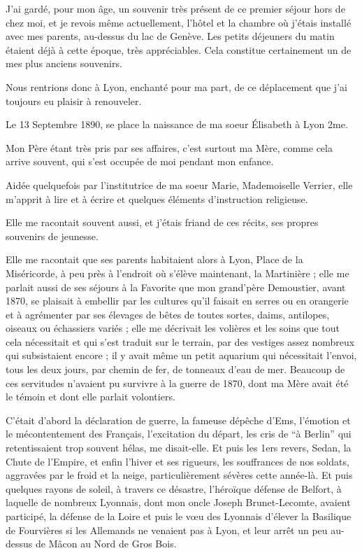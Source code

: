 \documentclass[11pt,a4paper]{report}
\begin{document}
J'ai gardé, pour mon âge, un souvenir très présent de ce premier séjour hors de chez moi, et je revois même actuellement, l'hôtel et la chambre où j'étais installé avec mes parents, au-dessus du lac de Genève. Les petits déjeuners du matin étaient déjà à cette époque, très appréciables. Cela constitue certainement un de mes plus anciens souvenirs.

Nous rentrions donc à Lyon, enchanté pour ma part, de ce déplacement que j'ai toujours eu plaisir à renouveler.

Le 13 Septembre 1890, se place la naissance de ma soeur Élisabeth à Lyon 2me.

Mon Père étant très pris par ses affaires, c'est surtout ma Mère, comme cela arrive souvent, qui s'est occupée de moi pendant mon enfance.

Aidée quelquefois par l'institutrice de ma soeur Marie, Mademoiselle Verrier, elle m'apprit à lire et à écrire et quelques éléments d'instruction religieuse.

Elle me racontait souvent aussi, et j'étais friand de ces récits, ses propres souvenirs de jeunesse.

Elle me racontait que ses parents habitaient alors à Lyon, Place de la Miséricorde, à peu près à l'endroit où s'élève maintenant, la Martinière ; elle me parlait aussi de ses séjours à la Favorite que mon grand'père Demoustier, avant 1870, se plaisait à embellir par les cultures qu'il faisait en serres ou en orangerie et à agrémenter par ses élevages de bêtes de toutes sortes, daims, antilopes, oiseaux ou échassiers variés ; elle me décrivait les volières et les soins que tout cela nécessitait et qui s'est traduit sur le terrain, par des vestiges assez nombreux qui subsistaient encore ; il y avait même un petit aquarium qui nécessitait l'envoi, tous les deux jours, par chemin de fer, de tonneaux d'eau de mer. Beaucoup de ces servitudes n'avaient pu survivre à la guerre de 1870, dont ma Mère avait été le témoin et dont elle parlait volontiers.

C'était d'abord la déclaration de guerre, la fameuse dépêche d'Ems, l'émotion et le mécontentement des Français, l'excitation du départ, les cris de ``à Berlin'' qui retentissaient trop souvent hélas, me disait-elle. Et puis les 1ers revers, Sedan, la Chute de l'Empire, et enfin l'hiver et ses rigueurs, les souffrances de nos soldats, aggravées par le froid et la neige, particulièrement sévères cette année-là. Et puis quelques rayons de soleil, à travers ce désastre, l'héroïque défense de Belfort, à laquelle de nombreux Lyonnais, dont mon oncle Joseph Brunet-Lecomte, avaient participé, la défense de la Loire et puis le vœu des Lyonnais d'élever la Basilique de Fourvières si les Allemands ne venaient pas à Lyon, et leur arrêt un peu au-dessus de Mâcon au Nord de Gros Bois.
\end{document}
